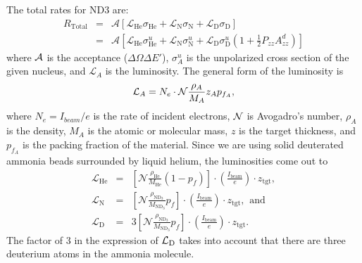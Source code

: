 \documentclass[11pt]{article}
\begin{document}
The total rates for ND3 are:
\begin{eqnarray}
R_{\mathrm{Total}}   &=& \mathcal{A}\left[ \mathcal{L}_{\mathrm{He}} \sigma_{\mathrm{He}}  + \mathcal{L}_{\mathrm{N}} \sigma_{\mathrm{N}} + \mathcal{L}_{\mathrm{D}} \sigma_{\mathrm{D}} \right]  \\
        &=& \mathcal{A}\left[ \mathcal{L}_{\mathrm{He}} \sigma_{\mathrm{He}}^u  + \mathcal{L}_{\mathrm{N}} \sigma_{\mathrm{N}}^u + \mathcal{L}_{\mathrm{D}} \sigma_{\mathrm{D}}^u\left( 1 + \frac{1}{2}P_{zz}A_{zz}^d \right) \right] 
\label{rt} 
\end{eqnarray}
where ${\cal A}$ is the acceptance ($\Delta \Omega \Delta E'$), $\sigma^u_A$ is the unpolarized cross section of the given nucleus, and $\mathcal{L}_A$ is the luminosity. The general form of the luminosity is
\begin{eqnarray}
\mathcal{L}_A = N_e \cdot {\cal N} \frac{\rho_A}{M_A} z_A p_{f_A},
\label{lumi}
\end{eqnarray}
where $N_e = I_{beam} / e$ is the rate of incident electrons, $\cal N$ is Avogadro's number, $\rho_A$ is the density, $M_A$ is the atomic or molecular mass, $z$ is the target thickness, and $p_{f_A}$ is the packing fraction of the material. Since we are using solid deuterated ammonia beads surrounded by liquid helium, the luminosities come out to
\newline
\begin{eqnarray}
\mathcal{L}_{\mathrm{He}} &=& \left[ \mathcal{N}  \frac{\rho_{\mathrm{He}}}{M_{\mathrm{He}}}\left(1 - p_f\right) \right] \cdot \left( \frac{I_{\mathrm{beam}}}{e} \right) \cdot z_{\mathrm{tgt}}, \\
\mathcal{L}_{\mathrm{N}} &=& \left[ \mathcal{N}  \frac{\rho_{\mathrm{ND}_3}}{M_{\mathrm{ND}_3}} p_f \right] \cdot \left( \frac{I_{\mathrm{beam}}}{e} \right) \cdot z_{\mathrm{tgt}},\hspace{5pt}\mathrm{and} \\
\mathcal{L}_{\mathrm{D}} &=& 3\left[ \mathcal{N}  \frac{\rho_{\mathrm{ND}_3}}{M_{\mathrm{ND}_3}} p_f \right] \cdot \left( \frac{I_{\mathrm{beam}}}{e} \right) \cdot z_{\mathrm{tgt}}. 
\label{la}
\end{eqnarray}
The factor of 3 in the expression of $\cal L_{\rm D} $ takes into account that there are three deuterium atoms in the ammonia molecule.
\end{document}
